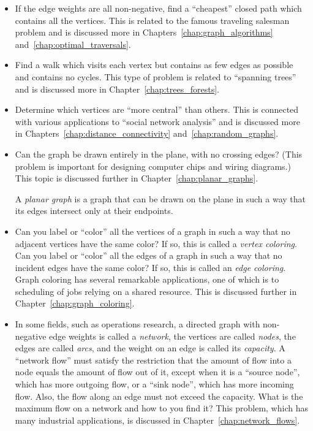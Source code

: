\begin{itemize}
\item If the edge weights are all non-negative, find a ``cheapest''
  closed path which contains all the vertices. This is related to the
  famous traveling salesman problem and is discussed more in
  Chapters~\ref{chap:graph_algorithms} and~\ref{chap:optimal_traversals}.

\item Find a walk which visits each vertex but contains as few edges
  as possible and contains no cycles. This type of problem is related
  to ``spanning trees'' and is discussed more in
  Chapter~\ref{chap:trees_forests}.

\item Determine which vertices are ``more central'' than others. This
  is connected with various applications to
  ``social network analysis'' and is discussed more in
  Chapters~\ref{chap:distance_connectivity}
  and~\ref{chap:random_graphs}.

\item Can the graph be drawn entirely in the plane, with no crossing
  edges? (This problem is important for designing computer chips and
  wiring diagrams.) This topic is discussed further in
  Chapter~\ref{chap:planar_graphs}.

A {\it planar graph} is a graph that can
be drawn on the plane in such a way that its edges intersect only at their endpoints.

\item Can you label or ``color'' all the vertices of a graph in such a
  way that no adjacent vertices have the same color? If so, this is
  called a \emph{vertex coloring}. Can you label or ``color'' all the
  edges of a graph in such a way that no incident edges have the same
  color? If so, this is called an \emph{edge coloring}. Graph coloring
  has several remarkable applications, one of which is to scheduling
  of jobs relying on a shared resource. This is discussed further in
  Chapter~\ref{chap:graph_coloring}.

\item In some fields, such as operations research, a directed graph
  with non-negative edge weights is called a \emph{network}, the
  vertices are called \emph{nodes}, the edges are called \emph{arcs},
  and the weight on an edge is called its \emph{capacity}. A
  ``network flow'' must satisfy the restriction that the amount of
  flow into a node equals the amount of flow out of it, except when it
  is a ``source node'', which has more outgoing flow, or a ``sink
  node'', which has more incoming flow. Also, the flow along an edge
  must not exceed the capacity. What is the maximum flow on a network
  and how to you find it? This problem, which has many industrial
  applications, is discussed in Chapter~\ref{chap:network_flows}.
\end{itemize}

